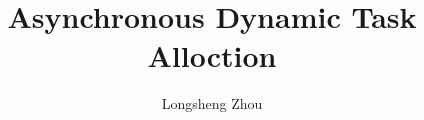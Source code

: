 \documentclass{ucalgthes1}
\title{Asynchronous Dynamic Task Alloction}
\author{Longsheng Zhou}
\begin{document}

\makethesistitle
{}     %
\setcounter{page}{1}

\newpage
{}
{}

\newpage
{}


\begin{singlespace}
\newpage
{}
\tableofcontents
\pagestyle{plain}
\newpage
{}
\pagestyle{plain}
\newpage
{}
\pagestyle{plain}
\clearpage
\clearpage          %
\end{singlespace}
\newpage
{}
\pagestyle{plain}
\clearpage






%
%
\def\newblock{\hskip .11em plus .33em minus .07em} %

\end{document}
